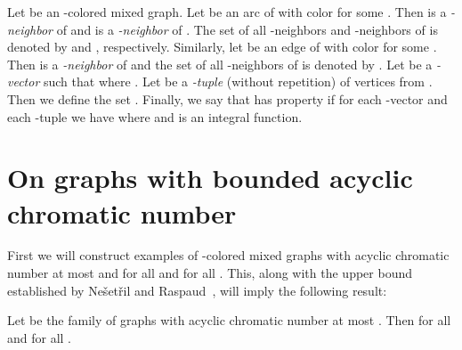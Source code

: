 \documentclass[11pt]{article}
\begin{document}
Let  be an -colored mixed graph. Let  be an arc of  with color  for some . 
Then  is a
\textit{-neighbor} of  and  is a \textit{-neighbor} of . The set of all -neighbors 
and -neighbors of  is denoted by  and , respectively. Similarly, 
let  be an edge of  with color  for some . Then  is a
\textit{-neighbor} of  and the set of all -neighbors of  is denoted by .
Let  be a \textit{-vector} such that 
 where . 
Let  be a \textit{-tuple} (without repetition) of  vertices  from . Then we define the set 
. 
Finally, we say that  has property  if for each -vector  and each -tuple  we have 
 where  and  is an integral function. 
  
  
  \section{On graphs with bounded acyclic chromatic number}\label{sec acyclic}
  First we will construct examples of -colored mixed graphs  with acyclic chromatic number at most  and 
   for all  and for all . This, along with the upper bound established by Ne\v{s}et\v{r}il and Raspaud~\cite{raspaud_and_nesetril}, will imply the following result:
  
  
  \begin{theorem}\label{acyclic-chromatic}
  Let  be the family of graphs with acyclic chromatic number at most . 
  Then  for all  and for all . 
  \end{theorem}
  
\end{document}
